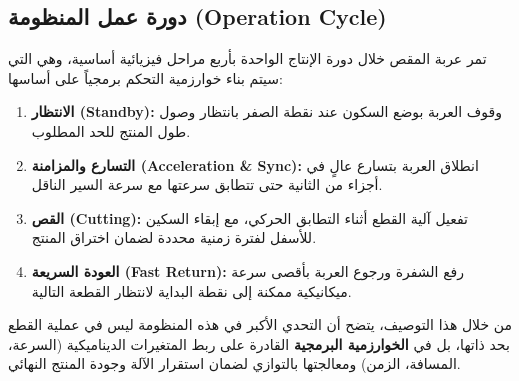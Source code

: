 \subsection{دورة عمل المنظومة \textenglish{(Operation Cycle)}}
تمر عربة المقص خلال دورة الإنتاج الواحدة بأربع مراحل فيزيائية أساسية، وهي التي سيتم بناء خوارزمية التحكم برمجياً على أساسها:
\begin{enumerate}
    \item \textbf{الانتظار \textenglish{(Standby)}:} وقوف العربة بوضع السكون عند نقطة الصفر بانتظار وصول طول المنتج للحد المطلوب.
    \item \textbf{التسارع والمزامنة \textenglish{(Acceleration \& Sync)}:} انطلاق العربة بتسارع عالٍ في أجزاء من الثانية حتى تتطابق سرعتها مع سرعة السير الناقل.
    \item \textbf{القص \textenglish{(Cutting)}:} تفعيل آلية القطع أثناء التطابق الحركي، مع إبقاء السكين للأسفل لفترة زمنية محددة لضمان اختراق المنتج.
    \item \textbf{العودة السريعة \textenglish{(Fast Return)}:} رفع الشفرة ورجوع العربة بأقصى سرعة ميكانيكية ممكنة إلى نقطة البداية لانتظار القطعة التالية.
\end{enumerate}

من خلال هذا التوصيف، يتضح أن التحدي الأكبر في هذه المنظومة ليس في عملية القطع بحد ذاتها، بل في \textbf{الخوارزمية البرمجية} القادرة على ربط المتغيرات الديناميكية (السرعة، المسافة، الزمن) ومعالجتها بالتوازي لضمان استقرار الآلة وجودة المنتج النهائي.